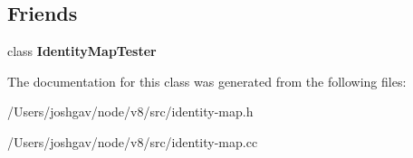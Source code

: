 \subsection*{Friends}
\begin{DoxyCompactItemize}
\item 
class {\bfseries Identity\+Map\+Tester}\hypertarget{classv8_1_1internal_1_1_identity_map_base_afddb20b5074fbbdae6a4a81ed82949f9}{}\label{classv8_1_1internal_1_1_identity_map_base_afddb20b5074fbbdae6a4a81ed82949f9}

\end{DoxyCompactItemize}


The documentation for this class was generated from the following files\+:\begin{DoxyCompactItemize}
\item 
/\+Users/joshgav/node/v8/src/identity-\/map.\+h\item 
/\+Users/joshgav/node/v8/src/identity-\/map.\+cc\end{DoxyCompactItemize}
